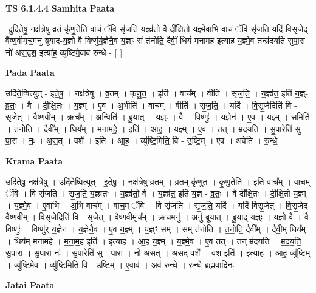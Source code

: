 \documentclass[17pt]{extarticle}
\begin{document}
\textbf{TS 6.1.4.4 } \newline
\textbf{Samhita Paata} \newline

-दुदि॑तेषु॒ नक्ष॑त्रेषु व्र॒तं कृ॑णु॒तेति॒ वाचं॒ ॅवि सृ॑जति य॒ज्ञ्व्र॑तो॒ वै दी᳚क्षि॒तो य॒ज्ञ्मे॒वाभि वाचं॒ ॅवि सृ॑जति॒ यदि॑ विसृ॒जेद्-वै᳚ष्ण॒वीमृच॒मनु॑ ब्रूयाद्-य॒ज्ञो वै विष्णु॑र्य॒ज्ञेनै॒व य॒ज्ञ्ꣳ सं त॑नोति॒ दैवीं॒ धियं॑ मनामह॒ इत्या॑ह य॒ज्ञ्मे॒व तन्म्र॑दयति सुपा॒रा नो॑ अस॒द्वश॒ इत्या॑ह॒ व्यु॑ष्टिमे॒वाव॑ रुन्धे - [  ] \newline

\textbf{Pada Paata} \newline

उदि॑ते॒ष्वित्युत् - इ॒ते॒षु॒ । नक्ष॑त्रेषु । व्र॒तम् । कृ॒णु॒त॒ । इति॑ । वाच᳚म् । वीति॑ । सृ॒ज॒ति॒ । य॒ज्ञ्व्र॑त॒ इति॑ य॒ज्ञ्-व्र॒तः॒ । वै । दी॒क्षि॒तः । य॒ज्ञ्म् । ए॒व । अ॒भीति॑ । वाच᳚म् । वीति॑ । सृ॒ज॒ति॒ । यदि॑ । वि॒सृ॒जेदिति॑ वि - सृ॒जेत् । वै॒ष्ण॒वीम् । ऋच᳚म् । अन्विति॑ । ब्रू॒या॒त् । य॒ज्ञ्ः । वै । विष्णुः॑ । य॒ज्ञेन॑ । ए॒व । य॒ज्ञ्म् । समिति॑ । त॒नो॒ति॒ । दैवी᳚म् । धिय᳚म् । म॒ना॒म॒हे॒ । इति॑ । आ॒ह॒ । य॒ज्ञ्म् । ए॒व । तत् । म्र॒द॒य॒ति॒ । सु॒पा॒रेति॑ सु - पा॒रा । नः॒ । अ॒स॒त् । वशे᳚ । इति॑ । आ॒ह॒ । व्यु॑ष्टि॒मिति॒ वि - उ॒ष्टि॒म् । ए॒व । अवेति॑ । रु॒न्धे॒ ।  \newline


\textbf{Krama Paata} \newline

उदि॑तेषु॒ नक्ष॑त्रेषु । उदि॑ते॒ष्वित्युत् - इ॒ते॒षु॒ । नक्ष॑त्रेषु व्र॒तम् । व्र॒तम् कृ॑णुत । कृ॒णु॒तेति॑ । इति॒ वाच᳚म् । वाच॒म् ॅवि । वि सृ॑जति । सृ॒ज॒ति॒ य॒ज्ञ्व्र॑तः । य॒ज्ञ्व्र॑तो॒ वै । य॒ज्ञ्व्र॑त॒ इति॑ य॒ज्ञ् - व्र॒तः॒ । वै दी᳚क्षि॒तः । दी॒क्षि॒तो य॒ज्ञ्म् । य॒ज्ञ्मे॒व । ए॒वाभि । अ॒भि वाच᳚म् । वाच॒म् ॅवि । वि सृ॑जति । सृ॒ज॒ति॒ यदि॑ । यदि॑ विसृ॒जेत् । वि॒सृ॒जेद् वै᳚ष्ण॒वीम् । वि॒सृ॒जेदिति॑ वि - सृ॒जेत् । वै॒ष्ण॒वीमृच᳚म् । ऋच॒मनु॑ । अनु॑ ब्रूयात् । ब्रू॒या॒द् य॒ज्ञ्ः । य॒ज्ञो वै । वै विष्णुः॑ । विष्णु॑र् य॒ज्ञेन॑ । य॒ज्ञेनै॒व । ए॒व य॒ज्ञ्म् । य॒ज्ञ्ꣳ सम् । सम् त॑नोति । त॒नो॒ति॒ दैवी᳚म् । दैवी॒म् धिय᳚म् । धिय॑म् मनामहे । म॒ना॒म॒ह॒ इति॑ । इत्या॑ह । आ॒ह॒ य॒ज्ञ्म् । य॒ज्ञ्मे॒व । ए॒व तत् । तन् म्र॑दयति । म्र॒द॒य॒ति॒ सु॒पा॒रा । सु॒पा॒रा नः॑ । सु॒पा॒रेति॑ सु - पा॒रा । नो॒ अ॒स॒त्॒ । अ॒स॒द् वशे᳚ । वश॒ इति॑ । इत्या॑ह । आ॒ह॒ व्यु॑ष्टिम् । व्यु॑ष्टिमे॒व । व्यु॑ष्टि॒मिति॒ वि - उ॒ष्टि॒म् । ए॒वाव॑ । अव॑ रुन्धे । रु॒न्धे॒ ब्र॒ह्म॒वा॒दिनः॑ \newline

\textbf{Jatai Paata} \newline
\end{document}
